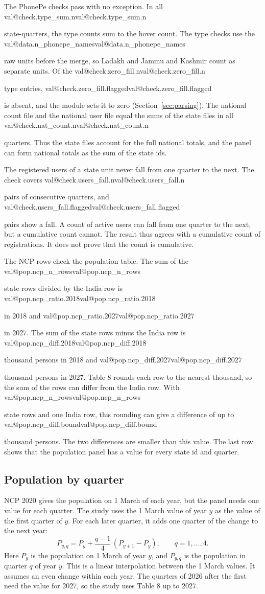 \documentclass[11pt,a4paper]{article}
\makeatletter
\newcommand{\val}[1]{\ifcsname val@#1\endcsname\csname val@#1\endcsname\else
  \PackageError{study}{Unknown value key `#1'}{Run Rscript src/R/part1_study.R}\fi}
\makeatother
\begin{document}
The PhonePe checks pass with no exception. In all \val{check.type_sum.n} state-quarters, the type counts sum to the hover count. The type checks use the \val{data.n_phonepe_names} raw units before the merge, so Ladakh and Jammu and Kashmir count as separate units. Of the \val{check.zero_fill.n} type entries, \val{check.zero_fill.flagged} is absent, and the module sets it to zero (Section~\ref{sec:parsing}). The national count file and the national user file equal the sums of the state files in all \val{check.nat_count.n} quarters. Thus the state files account for the full national totals, and the panel can form national totals as the sum of the state ids.

The registered users of a state unit never fall from one quarter to the next. The check covers \val{check.users_fall.n} pairs of consecutive quarters, and \val{check.users_fall.flagged} pairs show a fall. A count of active users can fall from one quarter to the next, but a cumulative count cannot. The result thus agrees with a cumulative count of registrations. It does not prove that the count is cumulative.

The NCP rows check the population table. The sum of the \val{pop.ncp_n_rows} state rows divided by the India row is \val{pop.ncp_ratio.2018} in 2018 and \val{pop.ncp_ratio.2027} in 2027. The sum of the state rows minus the India row is \val{pop.ncp_diff.2018} thousand persons in 2018 and \val{pop.ncp_diff.2027} thousand persons in 2027. Table 8 rounds each row to the nearest thousand, so the sum of the rows can differ from the India row. With \val{pop.ncp_n_rows} state rows and one India row, this rounding can give a difference of up to \val{pop.ncp_diff.bound} thousand persons. The two differences are smaller than this value. The last row shows that the population panel has a value for every state id and quarter.

\subsection{Population by quarter}\label{sec:population}
NCP 2020 gives the population on 1 March of each year, but the panel needs one value for each quarter. The study uses the 1 March value of year $y$ as the value of the first quarter of $y$. For each later quarter, it adds one quarter of the change to the next year:
\begin{equation}
P_{y,q} = P_y + \frac{q-1}{4}\,(P_{y+1} - P_y), \qquad q = 1, \ldots, 4.
\end{equation}
Here $P_y$ is the population on 1 March of year $y$, and $P_{y,q}$ is the population in quarter $q$ of year $y$. This is a linear interpolation between the 1 March values. It assumes an even change within each year. The quarters of 2026 after the first need the value for 2027, so the study uses Table 8 up to 2027.
\end{document}
